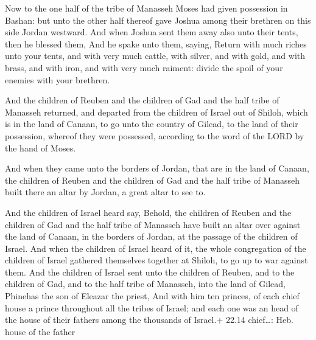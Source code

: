  Now to the one half of the tribe of Manasseh Moses had
given possession in Bashan: but unto the other half thereof gave Joshua
among their brethren on this side Jordan westward. And when Joshua sent
them away also unto their tents, then he blessed them,  And
he spake unto them, saying, Return with much riches unto your tents, and
with very much cattle, with silver, and with gold, and with brass, and
with iron, and with very much raiment: divide the spoil of your enemies
with your brethren.

 And the children of Reuben and the children of Gad and
the half tribe of Manasseh returned, and departed from the children of
Israel out of Shiloh, which is in the land of Canaan, to go unto the
country of Gilead, to the land of their possession, whereof they were
possessed, according to the word of the LORD by the hand of Moses.

 And when they came unto the borders of Jordan, that are
in the land of Canaan, the children of Reuben and the children of Gad
and the half tribe of Manasseh built there an altar by Jordan, a great
altar to see to.

 And the children of Israel heard say, Behold, the
children of Reuben and the children of Gad and the half tribe of
Manasseh have built an altar over against the land of Canaan, in the
borders of Jordan, at the passage of the children of Israel.
 And when the children of Israel heard of it, the whole
congregation of the children of Israel gathered themselves together at
Shiloh, to go up to war against them.  And the children of
Israel sent unto the children of Reuben, and to the children of Gad, and
to the half tribe of Manasseh, into the land of Gilead, Phinehas the son
of Eleazar the priest,  And with him ten princes, of each
chief house a prince throughout all the tribes of Israel; and each one
was an head of the house of their fathers among the thousands of
Israel.+ 22.14 chief\ldots: Heb. house of the father

